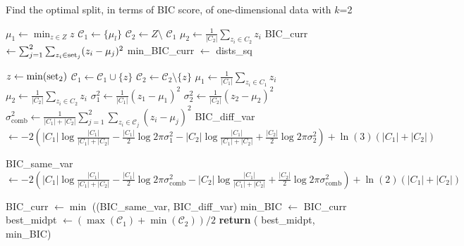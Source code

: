 \begin{algorithm}
\caption{Find the optimal split, in terms of BIC score, of one-dimensional data with $k$=2}
\label{alg:BICOneD}
\begin{algorithmic}[1]
\State  $\mu_1 \gets \min_{z \in Z} z $ 
\State $\mathcal{C}_1 \gets \lbrace \mu_l \rbrace $
\State $\mathcal{C}_2 \gets Z \setminus$ $\mathcal{C}_1$ 
\State $\mu_2 \gets\frac{1}{|C_2|} \sum_{ z_i \in C_2 } z_i $  
\State BIC\_curr $\gets \sum_{j=1}^2 \sum_{z_i \in \textnormal{set}_j} (z_i - \mu_j)^2$ 
\State min\_BIC\_curr $\gets$ dists\_sq

	\State $z \gets \min (\textnormal{set}_2)$
	\State $\mathcal{C}_1 \gets \mathcal{C}_1 \cup \lbrace z \rbrace$
	\State $\mathcal{C}_2 \gets \mathcal{C}_2 \setminus \lbrace z \rbrace$ 
	\State $\mu_1 \gets \frac{1}{|C_1|} \sum_{ z_i \in C_1 } z_i $  
	\State $\mu_2 \gets\frac{1}{|C_2|} \sum_{ z_i \in C_2 } z_i $  	
    \State $\sigma_1^2 \gets \frac{1}{|C_1|}(z_1 - \mu_1)^2 $
    \State $\sigma_2^2 \gets \frac{1}{|C_2|}(z_2 - \mu_2)^2 $
	\State $\sigma_\textrm{comb}^2 \gets \frac{1}{|C_1| + |C_2|}\sum_{j=1}^2 \sum_{z_i \in \mathcal{C}_j} (z_i - \mu_j)^2$ 		
	\State BIC\_diff\_var  $\gets -2(|C_1|\log \frac{|C_1|}{|C_1| + |C_2|} - \frac{|C_1|}{2}\log 2\pi \sigma_1^2 - |C_2|\log \frac{|C_1|}{|C_1| + |C_2|} + \frac{|C_2|}{2}\log 2\pi \sigma_2^2) + \ln(3)(|C_1|+|C_2|) $
	
	\State BIC\_same\_var $\gets -2(|C_1|\log \frac{|C_1|}{|C_1| + |C_2|}-\frac{|C_1|}{2}\log 2\pi \sigma_\textrm{comb}^2 - |C_2|\log \frac{|C_1|}{|C_1| + |C_2|} + \frac{|C_2|}{2}\log 2\pi \sigma_\textrm{comb}^2) + \ln(2)(|C_1|+|C_2|)$
	
	\State BIC\_curr $\gets \min$ ((BIC\_same\_var,  BIC\_diff\_var)
		\State min\_BIC $\gets$ BIC\_curr
		\State best\_midpt $\gets (\max(\mathcal{C}_1)+\min(\mathcal{C}_2))/2 $  %
	\EndIf	
   \EndWhile
\State \textbf{return} ( best\_midpt, min\_BIC)

\EndProcedure
\end{algorithmic}
\end{algorithm}



